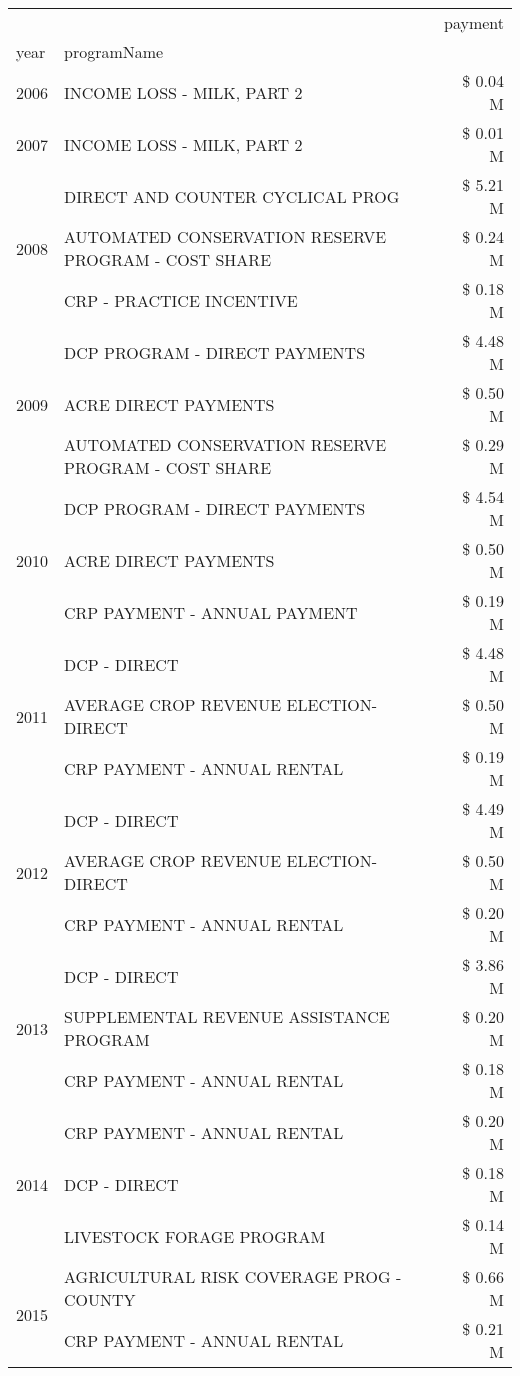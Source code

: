 \begin{tabular}{llr}
\toprule
 &  & payment \\
year & programName &  \\
\midrule
2006 & INCOME LOSS - MILK, PART 2 & \$ 0.04 M \\
\cline{1-3}
2007 & INCOME LOSS - MILK, PART 2 & \$ 0.01 M \\
\cline{1-3}
\multirow[t]{3}{*}{2008} & DIRECT AND COUNTER CYCLICAL PROG & \$ 5.21 M \\
 & AUTOMATED CONSERVATION RESERVE PROGRAM - COST SHARE & \$ 0.24 M \\
 & CRP - PRACTICE INCENTIVE & \$ 0.18 M \\
\cline{1-3}
\multirow[t]{3}{*}{2009} & DCP PROGRAM - DIRECT PAYMENTS & \$ 4.48 M \\
 & ACRE DIRECT PAYMENTS & \$ 0.50 M \\
 & AUTOMATED CONSERVATION RESERVE PROGRAM - COST SHARE & \$ 0.29 M \\
\cline{1-3}
\multirow[t]{3}{*}{2010} & DCP PROGRAM - DIRECT PAYMENTS & \$ 4.54 M \\
 & ACRE DIRECT PAYMENTS & \$ 0.50 M \\
 & CRP PAYMENT - ANNUAL PAYMENT & \$ 0.19 M \\
\cline{1-3}
\multirow[t]{3}{*}{2011} & DCP - DIRECT & \$ 4.48 M \\
 & AVERAGE CROP REVENUE ELECTION-DIRECT & \$ 0.50 M \\
 & CRP PAYMENT - ANNUAL RENTAL & \$ 0.19 M \\
\cline{1-3}
\multirow[t]{3}{*}{2012} & DCP - DIRECT & \$ 4.49 M \\
 & AVERAGE CROP REVENUE ELECTION-DIRECT & \$ 0.50 M \\
 & CRP PAYMENT - ANNUAL RENTAL & \$ 0.20 M \\
\cline{1-3}
\multirow[t]{3}{*}{2013} & DCP - DIRECT & \$ 3.86 M \\
 & SUPPLEMENTAL REVENUE ASSISTANCE PROGRAM & \$ 0.20 M \\
 & CRP PAYMENT - ANNUAL RENTAL & \$ 0.18 M \\
\cline{1-3}
\multirow[t]{3}{*}{2014} & CRP PAYMENT - ANNUAL RENTAL & \$ 0.20 M \\
 & DCP - DIRECT & \$ 0.18 M \\
 & LIVESTOCK FORAGE PROGRAM & \$ 0.14 M \\
\cline{1-3}
\multirow[t]{3}{*}{2015} & AGRICULTURAL RISK COVERAGE PROG - COUNTY & \$ 0.66 M \\
 & CRP PAYMENT - ANNUAL RENTAL & \$ 0.21 M \\

\end{tabular}
